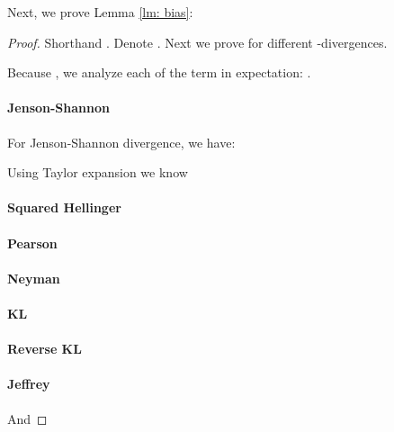 \documentclass{article}
\begin{document}
Next, we prove Lemma \ref{lm: bias}:
\begin{proof}
Shorthand .
    Denote . Next we prove   for different -divergences.
    
Because , we analyze each of the term in expectation: .
\paragraph{Jenson-Shannon} For Jenson-Shannon divergence, we have:

Using Taylor expansion we know




\paragraph{Squared Hellinger}






\paragraph{Pearson } 




\paragraph{Neyman } 



\paragraph{KL}


\paragraph{Reverse KL}




\paragraph{Jeffrey}

And



\end{proof}
\end{document}
